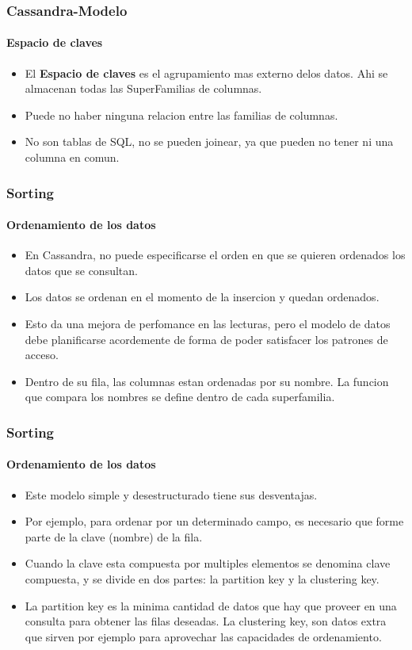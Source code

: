 \documentclass{beamer}
\begin{document}
\begin{frame}
  \frametitle{Cassandra-Modelo}
  \framesubtitle{Espacio de claves}
   
  \begin{itemize}
    \setlength{\itemsep}{4pt}
    \item El \textbf{Espacio de claves} es el agrupamiento mas externo delos datos. Ahi se almacenan todas las SuperFamilias de columnas.
    \pause
    \item Puede no haber ninguna relacion entre las familias de columnas. 
    \item No son tablas de SQL, no se pueden joinear, ya que pueden no tener ni una columna en comun.
    \end{itemize}
\end{frame}



\begin{frame}
  \frametitle{Sorting}
  \framesubtitle{Ordenamiento de los datos}
   
  \begin{itemize}
    \setlength{\itemsep}{4pt}
    \item En Cassandra, no puede especificarse el orden en que se quieren ordenados los datos que se consultan.
    \pause
    \item Los datos se ordenan en el momento de la insercion y quedan ordenados. 
    \pause
    \item Esto da una mejora de perfomance en las lecturas, pero el modelo de datos debe planificarse acordemente de
    forma de poder satisfacer los patrones de acceso.
    \item Dentro de su fila, las columnas estan ordenadas por su nombre. La funcion que compara los nombres se define dentro de cada superfamilia.
    \end{itemize}
\end{frame}

 
\begin{frame}
  \frametitle{Sorting}
  \framesubtitle{Ordenamiento de los datos}
   
  \begin{itemize}
    \setlength{\itemsep}{2pt}
    \item Este modelo simple y desestructurado tiene sus desventajas.
    \pause
    \item Por ejemplo, para ordenar por un determinado campo, es necesario que forme parte de la clave (nombre) de la fila. 
    \pause
    \item Cuando la clave esta compuesta por multiples elementos se denomina clave compuesta, y se divide en dos partes: la partition key y la clustering key.
    \pause
    \item La partition key es la minima cantidad de datos que hay que proveer en una consulta para obtener las filas deseadas. La clustering key, son datos extra que sirven por ejemplo para aprovechar las capacidades de ordenamiento.
    \end{itemize}
\end{frame}
\end{document}
